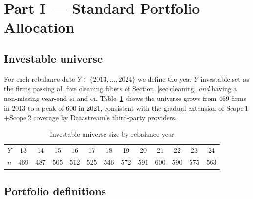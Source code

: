 \documentclass[11pt,a4paper]{article}
\begin{document}
\section{Part I --- Standard Portfolio Allocation}\label{sec:partI}

\subsection{Investable universe}

For each rebalance date $Y\in\{2013,\dots,2024\}$ we define the year-$Y$
investable set as the firms passing all five cleaning filters of
Section~\ref{sec:cleaning} \emph{and} having a non-missing year-end \textsc{ri}
and \textsc{ci}. Table~\ref{tab:n-inv} shows the universe grows from 469
firms in 2013 to a peak of 600 in 2021, consistent with the gradual
extension of Scope\,1$+$Scope\,2 coverage by Datastream's third-party
providers.

\begin{table}[H]
\centering
\small
\caption{Investable universe size by rebalance year}\label{tab:n-inv}
\begin{tabular}{l*{12}{c}}
\toprule
$Y$ & 13 & 14 & 15 & 16 & 17 & 18 & 19 & 20 & 21 & 22 & 23 & 24 \\
$n$ & 469 & 487 & 505 & 512 & 525 & 546 & 572 & 591 & 600 & 590 & 575 & 563 \\
\bottomrule
\end{tabular}
\end{table}


\subsection{Portfolio definitions}
\end{document}

